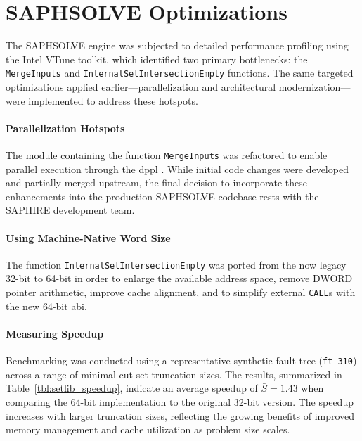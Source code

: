 \section{SAPHSOLVE Optimizations}
\label{sec:saphsolve_optimizations}

The SAPHSOLVE engine was subjected to detailed performance profiling using the Intel VTune toolkit, which identified two primary bottlenecks: the \texttt{MergeInputs} and \texttt{InternalSetIntersectionEmpty} functions. The same targeted optimizations applied earlier—parallelization and architectural modernization—were implemented to address these hotspots.

\paragraph{Parallelization Hotspots}
\label{sec:saphsolve_opt}

The module containing the function \texttt{MergeInputs} was refactored to enable parallel execution through the \acrfull{dppl} \cite{Delphi}. While initial code changes were developed and partially merged upstream, the final decision to incorporate these enhancements into the production SAPHSOLVE codebase rests with the SAPHIRE development team.

\paragraph{Using Machine-Native Word Size}

The function \texttt{InternalSetIntersectionEmpty} was ported from the now legacy 32-bit to 64-bit in order to enlarge the available address space, remove \textsf{DWORD} pointer arithmetic, improve cache alignment, and to simplify external \texttt{CALL}s with the new 64-bit \acrfull{abi}.

\paragraph{Measuring Speedup}

Benchmarking was conducted using a representative synthetic fault tree (\texttt{ft\_310}) across a range of minimal cut set truncation sizes. The results, summarized in Table~\ref{tbl:setlib_speedup}, indicate an average speedup of $\bar S = 1.43$ when comparing the 64-bit implementation to the original 32-bit version. The speedup increases with larger truncation sizes, reflecting the growing benefits of improved memory management and cache utilization as problem size scales.

